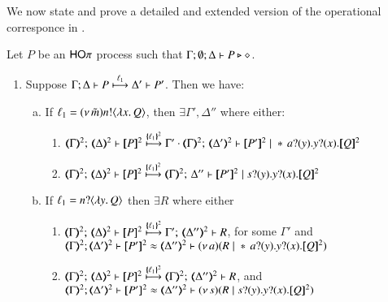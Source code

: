 We now state and prove a detailed and extended
version of the operational corresponce
in .

\begin{proposition}\myrm
	\label{app:prop:op_corr_HOp_to_p}
	Let $P$ be an  $\mathsf{HO}\pi$ process such that  $\Gamma; \emptyset; \Delta \vdash P \triangleright \diamond$.
	
	\begin{enumerate}[1.]
		\item Suppose $\Gamma; \Delta \vdash P \stackrel{\ell_1}{\longmapsto} \Delta' \vdash P'$.
		Then we have:
		\begin{enumerate}[a)]
			\item
				If  $\ell_1 = (\nu\, \tilde{m})n ! \langle \lambda x.\,Q \rangle$,
				then $\exists \Gamma', \Delta''$ where either:
				\begin{enumerate}[-]
					\item 
						$\tmap{\Gamma}{2};\, \tmap{\Delta}{2} \proves  \pmap{P}{2} 
						\hby{\mapa{\ell_1}^{2}}
						\Gamma' \cdot \tmap{\Gamma}{2};\, \tmap{\Delta'}{2} \proves \pmap{P'}{2} \Par \repl{} \binp{a}{y} \binp{y}{x} \pmap{Q}{2}$
					\item 
						$\tmap{\Gamma}{2};\, \tmap{\Delta}{2} \proves \pmap{P}{2} 
						\hby{\mapa{\ell_1}^{2}}
						\tmap{\Gamma}{2};\, \Delta'' \proves \pmap{P'}{2} \Par \binp{s}{y} \binp{y}{x} \pmap{Q}{2}$
				\end{enumerate}

			\item
				If   
				$\ell_1 = n ? \langle \lambda y.\,Q \rangle$
				then $\exists R$ where
				either
				\begin{enumerate}[-]
					\item 
						$\tmap{\Gamma}{2};\, \tmap{\Delta}{2} \proves \pmap{P}{2} 
						\hby{\mapa{\ell_1}^{2}}
						\Gamma';\, \tmap{\Delta''}{2} \proves  R$, for some $ \Gamma'$
						and \\ 
						$\horel{\tmap{\Gamma}{2}}{\tmap{\Delta'}{2}}{\pmap{P'}{2}}{\wb}{\tmap{\Delta''}{2}}{\newsp{a}{R \Par \repl{} \binp{a}{y} \binp{y}{x} \pmap{Q}{2}}}$
					\item 
						$\tmap{\Gamma}{2};\, \tmap{\Delta}{2} \proves \pmap{P}{2}
						\hby{\mapa{\ell_1}^{2}}
						\tmap{\Gamma}{2};\, \tmap{\Delta''}{2} \proves R$, 
						and \\ 
						$\horel{\tmap{\Gamma}{2}}{\tmap{\Delta'}{2}}{\pmap{P'}{2}}{\wb}{\tmap{\Delta''}{2}}{\newsp{s}{R \Par \binp{s}{y} \binp{y}{x} \pmap{Q}{2}}}$  		
				\end{enumerate}


\end{enumerate}
\end{enumerate}
\end{proposition}
